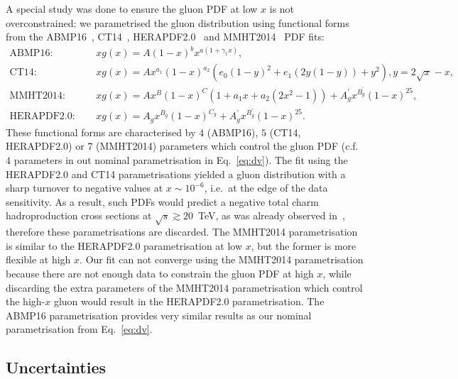 \documentclass[12pt]{article}
\begin{document}
A special study was done to ensure the gluon PDF at low $x$ is not overconstrained: we parametrised the gluon distribution using functional forms from the ABMP16~\cite{Alekhin:2017kpj}, CT14~\cite{Dulat:2015mca}, HERAPDF2.0~\cite{Abramowicz:2015mha} and MMHT2014~\cite{Harland-Lang:2014zoa} PDF fits:
\begin{equation}
\begin{aligned}
\textrm{ABMP16:}~~~~~~ &xg(x)=A (1 - x)^b x^{a (1 + \gamma_{1} x)},\\
\textrm{CT14:}~~~~~~ &xg(x) = Ax^{a_1}(1-x)^{a_2}(e_0(1-y)^2+e_1(2y(1-y))+y^2), y=2\sqrt{x}-x,\\
\textrm{MMHT2014:}~~~~~~ &xg(x) = Ax^B(1-x)^C(1+a_1x+a_2(2x^2-1))+A^{\prime}_gx^{B^{\prime}_g}(1-x)^{25},\\ 
\textrm{HERAPDF2.0:}~~~~~~ &xg(x)=A_gx^{B_g}(1-x)^{C_g}+A^{\prime}_gx^{B^{\prime}_g}(1-x)^{25}.
\end{aligned}
\end{equation}
These functional forms are characterised by $4$ (ABMP16), $5$ (CT14, HERAPDF2.0) or $7$ (MMHT2014) parameters which control the gluon PDF (c.f.\ $4$ parameters in out nominal parametrisation in Eq.~\ref{eq:dv}). The fit using the HERAPDF2.0 and CT14 parametrisations yielded a gluon distribution with a sharp turnover to negative values at $x \sim 10^{-6}$, i.e.\ at the edge of the data sensitivity. As a result, such PDFs would predict a negative total charm hadroproduction cross sections at $\sqrt{s} \gtrsim 20$~TeV, as was already observed in~\cite{Garzelli:2015psa,Accardi:2016ndt}, therefore these parametrisations are discarded. The MMHT2014 parametrisation is similar to the HERAPDF2.0 parametrisation at low $x$, but the former is more flexible at high $x$. Our fit can not converge using the MMHT2014 parametrisation because there are not enough data to constrain the gluon PDF at high $x$, while discarding the extra parameters of the MMHT2014 parametrisation which control the high-$x$ gluon would result in the HERAPDF2.0 parametrisation. The ABMP16 parametrisation provides very similar results as our nominal parametrisation from Eq.~\ref{eq:dv}.

\subsection{Uncertainties}
\label{sec:pdfparam}
\end{document}
